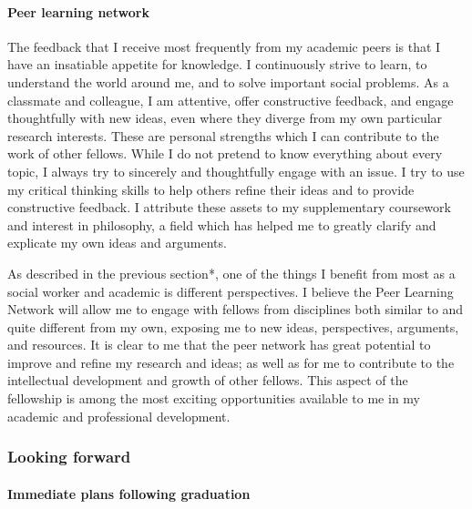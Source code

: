 \documentclass[twocolumn, serif, rga, authordate]{jote-article}
\begin{document}
\paragraph{Peer learning network}


The feedback that I receive most frequently from my academic peers is
that I have an insatiable appetite for knowledge. I continuously strive
to learn, to understand the world around me, and to solve important
social problems. As a classmate and colleague, I am attentive, offer
constructive feedback, and engage thoughtfully with new ideas, even
where they diverge from my own particular research interests. These are
personal strengths which I can contribute to the work of other fellows.
While I do not pretend to know everything about every topic, I always
try to sincerely and thoughtfully engage with an issue. I try to use my
critical thinking skills to help others refine their ideas and to
provide constructive feedback. I attribute these assets to my
supplementary coursework and interest in philosophy, a field which has
helped me to greatly clarify and explicate my own ideas and arguments.

As described in the previous section*, one of the things I benefit from
most as a social worker and academic is different perspectives. I
believe the Peer Learning Network will allow me to engage with fellows
from disciplines both similar to and quite different from my own,
exposing me to new ideas, perspectives, arguments, and resources. It is
clear to me that the peer network has great potential to improve and
refine my research and ideas; as well as for me to contribute to the
intellectual development and growth of other fellows. This aspect of the
fellowship is among the most exciting opportunities available to me in
my academic and professional development.





\subsubsection*{Looking forward}



\paragraph{Immediate plans following graduation}
\end{document}
